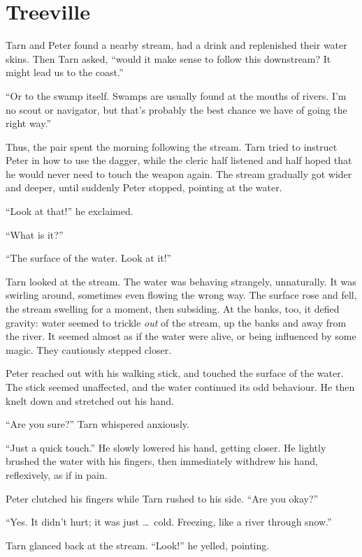 \chapter{Treeville}

Tarn and Peter found a nearby stream, had a drink and replenished their water skins.  Then Tarn asked, ``would it make sense to follow this downstream?  It might lead us to the coast.''

``Or to the swamp itself.  Swamps are usually found at the mouths of rivers.  I'm no scout or navigator, but that's probably the best chance we have of going the right way.''

Thus, the pair spent the morning following the stream.  Tarn tried to instruct Peter in how to use the dagger, while the cleric half listened and half hoped that he would never need to touch the weapon again.  The stream gradually got wider and deeper, until suddenly Peter stopped, pointing at the water.

``Look at that!'' he exclaimed.

``What is it?''

``The surface of the water.  Look at it!''

Tarn looked at the stream.  The water was behaving strangely, unnaturally.  It was swirling around, sometimes even flowing the wrong way.  The surface rose and fell, the stream swelling for a moment, then subsiding.  At the banks, too, it defied gravity: water seemed to trickle \emph{out} of the stream, up the banks and away from the river.  It seemed almost as if the water were alive, or being influenced by some magic.  They cautiously stepped closer.

Peter reached out with his walking stick, and touched the surface of the water.  The stick seemed unaffected, and the water continued its odd behaviour.  He then knelt down and stretched out his hand.

``Are you sure?'' Tarn whispered anxiously.

``Just a quick touch.''  He slowly lowered his hand, getting closer.  He lightly brushed the water with his fingers, then immediately withdrew his hand, reflexively, as if in pain.

Peter clutched his fingers while Tarn rushed to his side.  ``Are you okay?''

``Yes.  It didn't hurt; it was just \ldots\ cold.  Freezing, like a river through snow.''

Tarn glanced back at the stream.  ``Look!'' he yelled, pointing.

